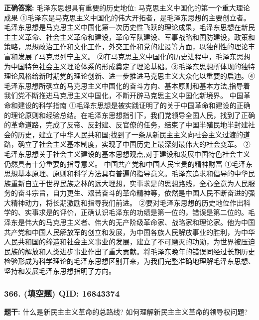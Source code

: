 \documentclass[12pt,UTF8]{ctexart}
\begin{document}
\textbf{正确答案:}
毛泽东思想具有重要的历史地位:
马克思主义中国化的第一个重大理论成果
①毛泽东是马克思主义中国化的伟大开拓者，是毛泽东思想的主要创立者。毛泽东思想是马克思主义中国化第一次历史性飞跃的理论成果，毛泽东思想在新民主主义革命、社会主义革命和建设，革命军队建设、军事战略和国防建设，政策和策略，思想政治工作和文化工作，外交工作和党的建设等方面，以独创性的理论丰富和发展了马克思列宁主义。
②在马克思主义中国化的历史进程中，毛泽东思想为中国特色社会主义理论体系的形成奠定了理论基础。③毛泽东思想所体现的独特理论风格给新时期党的理论创新、进一步推进马克思主义大众化以重要的启迪。④毛泽东思想所确立的马克思主义中国化的奋斗方向、基本原则和基本方法,指导着我们党不断推进马克思主义中国化，不断开辟马克思主义中国化新境界。
中国革命和建设的科学指南
①毛泽东思想是被实践证明了的关于中国革命和建设的正确的理论原则和经验总结。在毛泽东思想指引下，我们党领导全国人民，找到了正确的革命道路，完成了反帝、反封建、反官僚的任务，结束了中国半殖民地半封建社会的历史，建立了中华人民共和国;找到了一条从新民主主义向社会主义过渡的道路，确立了社会主义基本制度，实现了中国历史上最深刻最伟大的社会变革。
②毛泽东思想关于社会主义建设的基本思想观点,对于建设和发展中国特色社会主义仍然具有十分重要的指导意义。
中国共产党和中国人民宝贵的精神财富
①毛泽东思想基本原理、原则和科学方法具有普遍的指导意义。毛泽东追求和倡导的中华民族重新自立于世界民族之林的远大理想，实事求是的思想路线，全心全意为人民服务的奋斗宗旨，自力更生、艰苦奋斗的革命精神等，依然是中国人民不断奋进的强大精神动力，将长期激励和指导我们前进。
②要对毛泽东思想的历史地位作出科学的、实事求是的评价，正确认识毛泽东的功绩是第一位的，错误是第二位的。毛泽东是伟大的马克思主义者、伟大的无产阶级革命家、战略家和理论家。他为中国共产党和中国人民解放军的创立和发展，为中国各族人民解放事业的胜利，为中华人民共和国的缔造和社会主义事业的发展，建立了不可磨灭的功勋，为世界被压迫民族的解放和人类进步事业作出了重大贡献。将毛泽东晚年的错误同经过长期历史检验形成为科学理论的毛泽东思想区别开来，为我们完整准确地理解毛泽东思想、坚持和发展毛泽东思想指明了方向。

\vspace{0.3em}\hrulefill\vspace{0.7em}

\subsubsection*{366. (填空题) \small QID: 16843374}

\textbf{题干:}
什么是新民主主义革命的总路线? 如何理解新民主主义革命的领导权问题?
\end{document}

